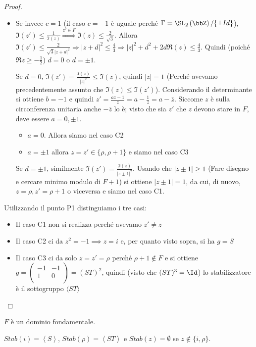 \begin{proof}
\begin{itemize}
\item Se invece $c=1$ (il caso $c=-1$ è uguale perché
  $\Gamma=\SL_2 \left( \bbZ \right)/\{\pm Id\}$),
  $\Im(z') \leq \frac{1}{\Im(z)} \stackrel{z' \in F}{\Rightarrow} \Im(z) \leq \frac{2}{\sqrt{3}}$.
  Allora $\Im(z') \leq \frac{2}{\sqrt{3}|z+d|^2} \Rightarrow
  |z+d|^2 \leq \frac{4}{3} \Rightarrow |z|^2+d^2+2d \Re(z) \leq \frac{4}{3}$. 
  Quindi (poiché $\Re z \ge -\frac{1}{2}$) $d=0$ o $d=\pm 1$.

  Se $d=0$, $\Im(z') = \frac{\Im(z)}{|z|^2} \leq \Im(z)$, quindi $|z|=1$ (Perché avevamo precedentemente assunto che $\Im(z) \le \Im(z')$).
  Considerando il determinante si ottiene $b = -1$ e quindi $z' = \frac{az - 1}{z} = a - \frac{1}{z} = a - \bar{z}$. Siccome $z$ è sulla circonferenza unitaria anche $- \bar{z}$ lo è; visto che sia $z'$ che $z$ devono stare in $F$, deve essere $a = 0, \pm 1$.
  \begin{itemize}
  \item $a = 0$. Allora siamo nel caso C2
  \item $a = \pm 1$ allora $z = z' \in \{\rho, \rho + 1\}$ e siamo nel caso C3
  \end{itemize}

  Se $d=\pm 1$, similmente $\Im(z') = \frac{\Im(z)}{|z \pm 1|^2}$. Usando che $|z \pm 1| \ge 1$ (Fare disegno e cercare minimo modulo di $F + 1$)
  si ottiene $|z \pm 1|=1$, da cui, di nuovo, $z=\rho, z'=\rho + 1$ o viceversa e siamo nel caso C1.
\end{itemize}

\bigskip
{} Utilizzando il punto P1 distinguiamo i tre casi:
\begin{itemize}
\item Il caso C1 non si realizza perché avevamo $z' \neq z$
\item Il caso C2 ci da $z^2 = -1 \implies z = i$ e, per quanto visto sopra, si ha $g = S$
\item Il caso C3 ci da solo $z = z' = \rho$ perché $\rho + 1 \notin F$ e si ottiene $g = \left(\begin{array}{cc} -1 & -1 \\ 1 & 0 \\ \end{array} \right) = (ST)^2$, quindi (visto che $(ST)^3 = \Id$) lo stabilizzatore è il sottogruppo $\langle ST \rangle$
\end{itemize}
\end{proof}

\begin{corollario}
$F$ è un dominio fondamentale.

$Stab(i)=\left\langle S \right\rangle$, 
$Stab(\rho)=\left\langle ST \right\rangle$ e $Stab(z)=\emptyset$ se 
$z \notin \{i, \rho \}$.
\end{corollario}


